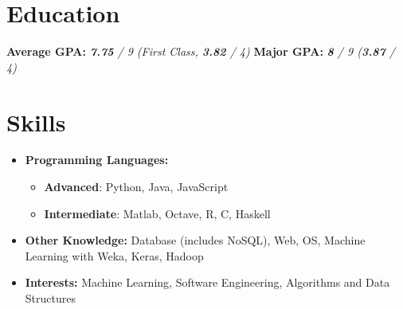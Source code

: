 \documentclass{resume}
\begin{document}



\section{Education}
\textbf{Average GPA:} \textit{\textbf{7.75} / 9 (First Class, \textbf{3.82} / 4)} \hspace{0.6cm} \textbf{Major GPA:} \textit{\textbf{8} / 9 (\textbf{3.87} / 4)}

\section{Skills}
\begin{itemize}[parsep=0.5ex]
  \item \textbf{Programming Languages:} 
  \begin{itemize}
    \item \textbf{Advanced}: Python, Java, JavaScript
    \item \textbf{Intermediate}: Matlab, Octave, R, C, Haskell
  \end{itemize}
  \item \textbf{Other Knowledge:} Database (includes NoSQL), Web, OS, Machine Learning with Weka, Keras, Hadoop
  \item \textbf{Interests:} Machine Learning, Software Engineering, Algorithms and Data Structures
\end{itemize}
\end{document}
